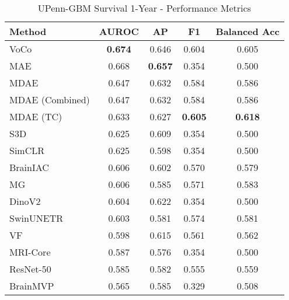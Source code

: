 \begin{table}[ht]
\centering
\caption{UPenn-GBM Survival 1-Year - Performance Metrics}
\label{tab:upenn_gbm_survival_1year}
\begin{tabular}{lcccc}
\toprule
Method & AUROC & AP & F1 & Balanced Acc \\
\midrule
VoCo & \textbf{0.674} & 0.646 & 0.604 & 0.605 \\
MAE & 0.668 & \textbf{0.657} & 0.354 & 0.500 \\
MDAE & 0.647 & 0.632 & 0.584 & 0.586 \\
MDAE (Combined) & 0.647 & 0.632 & 0.584 & 0.586 \\
MDAE (TC) & 0.633 & 0.627 & \textbf{0.605} & \textbf{0.618} \\
S3D & 0.625 & 0.609 & 0.354 & 0.500 \\
SimCLR & 0.625 & 0.598 & 0.354 & 0.500 \\
BrainIAC & 0.606 & 0.602 & 0.570 & 0.579 \\
MG & 0.606 & 0.585 & 0.571 & 0.583 \\
DinoV2 & 0.604 & 0.622 & 0.354 & 0.500 \\
SwinUNETR & 0.603 & 0.581 & 0.574 & 0.581 \\
VF & 0.598 & 0.615 & 0.561 & 0.562 \\
MRI-Core & 0.587 & 0.576 & 0.354 & 0.500 \\
ResNet-50 & 0.585 & 0.582 & 0.555 & 0.559 \\
BrainMVP & 0.565 & 0.585 & 0.329 & 0.508 \\
\bottomrule
\end{tabular}
\end{table}
